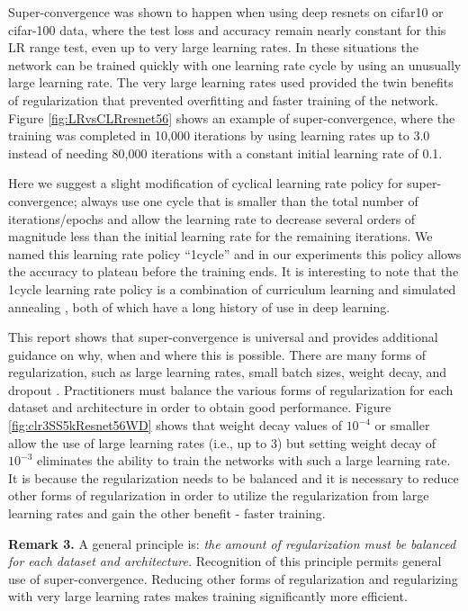 \documentclass{article} %
\begin{document}
Super-convergence \citep{smith2017super} was shown to happen when using deep resnets on cifar10 or cifar-100 data, where the test loss and accuracy remain nearly constant for this LR range test, even up to very large learning rates.  In these situations the  network can be trained quickly with one learning rate cycle by using an unusually large learning rate. The very large learning rates used provided the twin benefits of regularization that prevented overfitting and faster training of the network.  Figure \ref{fig:LRvsCLRresnet56} shows an example of super-convergence, where the training was completed in 10,000 iterations  by using learning rates up to 3.0 instead of needing 80,000 iterations with a constant initial learning rate of 0.1.  

Here we suggest a slight modification of cyclical learning rate policy for super-convergence; always use one cycle that is smaller than the total number of iterations/epochs and allow the learning rate to decrease several orders of magnitude less than the initial learning rate for the remaining iterations.  We named this learning rate policy ``1cycle'' and in our experiments this policy allows the accuracy to plateau before the training ends.  It is interesting to note that the 1cycle learning rate policy is a combination of curriculum learning  \citep{bengio2009curriculum} and simulated annealing \citep{aarts1988simulated}, both of which have a long history of use in deep learning.

This report shows that super-convergence is universal and provides additional guidance on why, when and where this is possible. There are many forms of regularization, such as large learning rates, small batch sizes, weight decay, and dropout \citep{srivastava2014dropout}.  Practitioners must balance the various forms of regularization for each dataset and architecture in order to obtain good performance.  Figure \ref{fig:clr3SS5kResnet56WD}  shows that weight decay values of $10^{-4}$ or smaller allow the use of large learning rates (i.e., up to 3) but setting weight decay of $10^{-3}$ eliminates the ability to train the networks with such a large learning rate.  It is because the regularization needs to be balanced and it is necessary to reduce other forms of regularization in order to utilize the regularization from large learning rates and gain the other benefit - faster training.

\textbf{Remark 3.}
A general principle is: \emph{the amount of regularization must be balanced for each dataset and architecture.}  Recognition of this principle permits general use of super-convergence.  Reducing other forms of regularization and regularizing with very large learning rates makes training significantly more efficient.  
\end{document}
